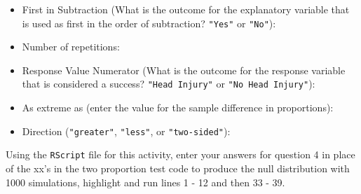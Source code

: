 \documentclass[
]{report}
\providecommand{\tightlist}{%
  \setlength{\itemsep}{0pt}\setlength{\parskip}{0pt}}
\begin{document}
\vspace{.2in}

\begin{itemize}
\tightlist
\item
  First in Subtraction (What is the outcome for the explanatory variable that is used as first in the order of subtraction? \texttt{"Yes"} or \texttt{"No"}):
\end{itemize}

\vspace{.2in}

\begin{itemize}
\tightlist
\item
  Number of repetitions:
\end{itemize}

\vspace{.2in}

\begin{itemize}
\tightlist
\item
  Response Value Numerator (What is the outcome for the response variable that is considered a success? \texttt{"Head\ Injury"} or \texttt{"No\ Head\ Injury"}):
\end{itemize}

\vspace{.2in}

\begin{itemize}
\tightlist
\item
  As extreme as (enter the value for the sample difference in proportions):
\end{itemize}

\vspace{.2in}

\begin{itemize}
\tightlist
\item
  Direction (\texttt{"greater"}, \texttt{"less"}, or \texttt{"two-sided"}):
\end{itemize}

\vspace{.2in}

Using the \texttt{RScript} file for this activity, enter your answers for question 4 in place of the xx's in the two proportion test code to produce the null distribution with 1000 simulations, highlight and run lines 1 - 12 and then 33 - 39.
\end{document}
